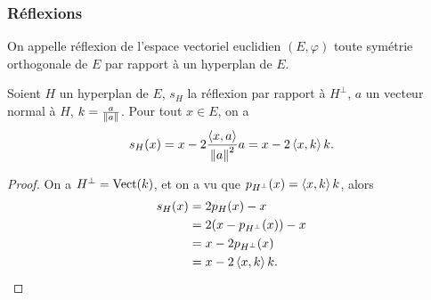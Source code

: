 \subsubsection{Réflexions}

\begin{defdef}
  On appelle réflexion de l'espace vectoriel euclidien $(E,\varphi)$ toute symétrie orthogonale de $E$ par rapport à un hyperplan de $E$.
\end{defdef}
\begin{prop}
  Soient $H$ un hyperplan de $E$, $s_H$ la réflexion par rapport à $H^\perp$, $a$ un vecteur normal à $H$, $k=\frac{a}{\left\lVert a\right\rVert}$. Pour tout $x \in E$, on a
  \begin{equation}
    s_H(x)=x-2\frac{\left\langle{x},{a}\right\rangle}{\left\lVert a\right\rVert^2}a = x-2\left\langle{x},{k}\right\rangle k.
  \end{equation}
\end{prop}
\begin{proof}
  On a $H^\perp = \operatorname{Vect}(k)$, et on a vu que $p_{H^\perp}(x)=\left\langle{x},{k}\right\rangle k$, alors
  \begin{align}
    s_{H}(x)&=2p_H(x)-x\\
    &=2(x-p_{H^\perp}(x))-x\\
    &=x-2p_{H^\perp}(x)\\
    &=x-2\left\langle{x},{k}\right\rangle k.
  \end{align}
\end{proof}

